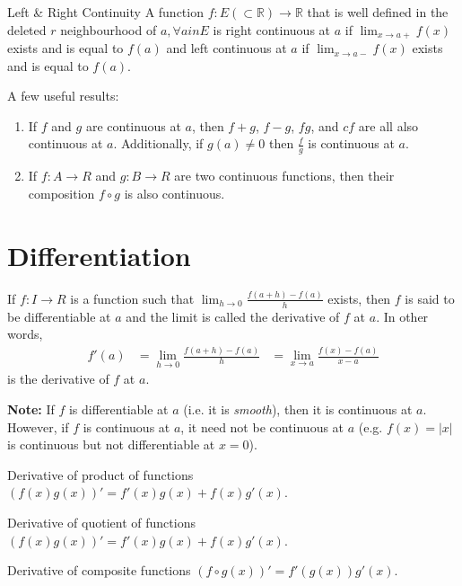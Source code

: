 \documentclass[titlepage, 12pt]{book}
\begin{document}
\begin{definition}{Left \& Right Continuity}{}
    A function $f:E(\subset\mathbb{R})\rightarrow\mathbb{R}$ that is well
    defined in the deleted $r$ neighbourhood of $a, \forall a in E$ is right
    continuous at $a$ if $\lim_{x\rightarrow a+}f(x)$ exists and is equal to
    $f(a)$ and left continuous at $a$ if $\lim_{x\rightarrow a-}f(x)$ exists and
    is equal to $f(a)$.
\end{definition}

A few useful results:
\begin{enumerate}
    \item If $f$ and $g$ are continuous at $a$, then $f + g$, $f - g$, $fg$, and
        $cf$ are all also continuous at $a$. Additionally, if $g(a)\neq 0$ then
        $\frac{f}{g}$ is continuous at $a$.
    \item If $f:A\rightarrow R$ and $g:B\rightarrow R$ are two continuous
        functions, then their composition $f\circ g$ is also continuous.
\end{enumerate}

\chapter{Differentiation}
If $f:I\rightarrow R$ is a function such that $\lim_{h\rightarrow 0}\frac{f(a +
h) - f(a)}{h}$ exists, then $f$ is said to be differentiable at $a$ and the
limit is called the derivative of $f$ at $a$. In other words,
\begin{align*}
    f'(a) &= \lim_{h\rightarrow 0}\frac{f(a + h) - f(a)}{h}
          &= \lim_{x\rightarrow a}\frac{f(x) - f(a)}{x - a}
\end{align*}
is the derivative of $f$ at $a$.

\textbf{Note:} If $f$ is differentiable at $a$ (i.e. it is \textit{smooth}),
then it is continuous at $a$. However, if $f$ is continuous at $a$, it need not
be continuous at $a$ (e.g. $f(x) = |x|$ is continuous but not differentiable at
$x = 0$).

\begin{theorem}{Derivative of product of functions}{}
    $(f(x)g(x))' = f'(x)g(x) + f(x)g'(x)$.
\end{theorem}

\begin{theorem}{Derivative of quotient of functions}{}
    $(f(x)g(x))' = f'(x)g(x) + f(x)g'(x)$.
\end{theorem}

\begin{theorem}{Derivative of composite functions}{}
    $(f\circ g(x))' = f'(g(x))g'(x)$.
\end{theorem}
\end{document}

